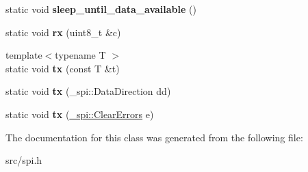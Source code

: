 \begin{DoxyCompactItemize}
\item 
static void {\bfseries sleep\+\_\+until\+\_\+data\+\_\+available} ()\hypertarget{classSpiMaster_a326ac17e36658088a33d27ad788ce315}{}\label{classSpiMaster_a326ac17e36658088a33d27ad788ce315}

\item 
static void {\bfseries rx} (uint8\+\_\+t \&c)\hypertarget{classSpiMaster_a531c31eeecb93de2deae102c3a89e46e}{}\label{classSpiMaster_a531c31eeecb93de2deae102c3a89e46e}

\item 
{\footnotesize template$<$typename T $>$ }\\static void {\bfseries tx} (const T \&t)\hypertarget{classSpiMaster_ad4971c2ca4c7e3eb26c938f807f3daa2}{}\label{classSpiMaster_ad4971c2ca4c7e3eb26c938f807f3daa2}

\item 
static void {\bfseries tx} (\+\_\+spi\+::\+Data\+Direction dd)\hypertarget{classSpiMaster_aadf80e091329354903f5eef086efaf32}{}\label{classSpiMaster_aadf80e091329354903f5eef086efaf32}

\item 
static void {\bfseries tx} (\hyperlink{class__transmission_1_1ClearErrors}{\+\_\+spi\+::\+Clear\+Errors} e)\hypertarget{classSpiMaster_a5bf811b0e51d0dcbbf53a19850bb58fb}{}\label{classSpiMaster_a5bf811b0e51d0dcbbf53a19850bb58fb}

\end{DoxyCompactItemize}


The documentation for this class was generated from the following file\+:\begin{DoxyCompactItemize}
\item 
src/spi.\+h\end{DoxyCompactItemize}

